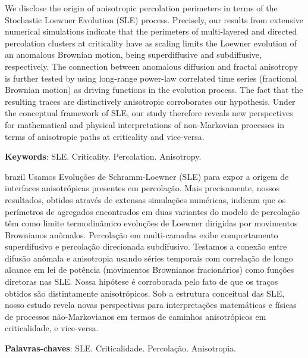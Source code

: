\setlength{\absparsep}{18pt} %
\begin{resumo}
    We disclose the origin of anisotropic percolation perimeters in terms of
    the Stochastic Loewner Evolution (SLE) process. Precisely, our results from
    extensive numerical simulations indicate that the perimeters of
    multi-layered and directed percolation clusters at criticality have as
    scaling limits the Loewner evolution of an anomalous Brownian motion,
    being superdiffusive and subdiffusive, respectively. The connection between
    anomalous diffusion and fractal anisotropy is further tested by using
    long-range power-law correlated time series (fractional Brownian motion) as
    driving functions in the evolution process. The fact that the resulting
    traces are distinctively anisotropic corroborates our hypothesis. Under the
    conceptual framework of SLE, our study therefore reveals new perspectives
    for mathematical and physical interpretations of non-Markovian processes in
    terms of anisotropic paths at criticality and vice-versa.
    \vspace{\onelineskip}
    \noindent 

    \textbf{Keywords}: SLE\@. Criticality. Percolation. Anisotropy.
\end{resumo}

\begin{resumo}[Resumo]
\begin{otherlanguage*}{brazil}
    Usamos Evoluções de Schramm-Loewner (SLE) para expor a origem de interfaces
    anisotrópicas presentes em percolação. Mais precisamente, nossos
    resultados, obtidos através de extensas simulações numéricas, indicam que
    os perímetros de agregados encontrados em duas variantes do modelo de
    percolação têm como limite termodinâmico evoluções de Loewner dirigidas por
    movimentos Brownianos anômalos. Percolação em multi-camadas exibe
    comportamento superdifusivo e percolação direcionada subdifusivo.
    Testamos a conexão entre difusão anômala e anisotropia usando séries
    temporais com correlação de longo alcance em lei de potência (movimentos
    Brownianos fracionários) como funções diretoras nas SLE\@. Nossa hipótese
    é corroborada pelo fato de que os traços obtidos são distintamente
    anisotrópicos. Sob a estrutura conceitual das SLE, nosso estudo revela
    novas perspectivas para interpretações matemáticas e físicas de processos
    não-Markovianos em termos de caminhos anisotrópicos em criticalidade, e
    vice-versa.
    \vspace{\onelineskip}
    \noindent 

    \textbf{Palavras-chaves}: SLE\@. Criticalidade. Percolação. Anisotropia.
\end{otherlanguage*}
\end{resumo}
